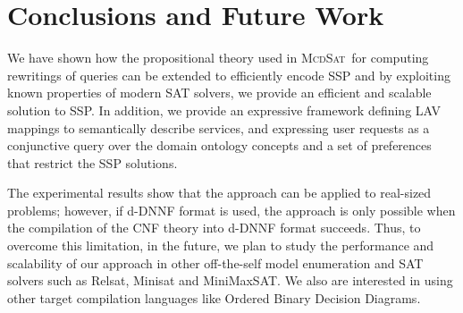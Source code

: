 \documentclass{llncs}
\newcommand{\mcdsat}{\textsc{McdSat}}
\begin{document}
\section{Conclusions and Future Work}
We have shown how the propositional theory used in \mcdsat\  for computing
rewritings of queries can be extended to efficiently encode SSP and by exploiting
known properties of modern SAT solvers, we provide an efficient and scalable
solution to SSP. In addition, we provide an expressive framework defining LAV
mappings to semantically describe services, and expressing user requests as a
conjunctive query over the domain ontology concepts and a set of preferences
that restrict the SSP solutions.

The experimental results show that the approach can be applied to real-sized
problems; however, if d-DNNF format is used, the approach is only possible
when the compilation of the CNF theory into d-DNNF format succeeds. Thus,
to overcome this limitation, in the future, we plan to study the performance
and scalability of our approach in other off-the-self model enumeration and SAT
solvers such as Relsat, Minisat and MiniMaxSAT. We also are interested in using
other target compilation languages like Ordered Binary Decision Diagrams.



\end{document}
